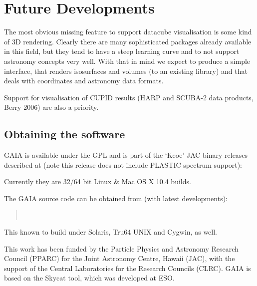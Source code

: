 \documentclass[11pt,twoside]{article}  %
\begin{document}
\section{Future Developments}

The most obvious missing feature to support datacube visualisation is some
kind of 3D rendering. Clearly there are many sophisticated packages already
available in this field, but they tend to have a steep learning curve and to
not support astronomy concepts very well. With that in mind we expect to
produce a simple interface, that renders isosurfaces and volumes (to an
existing library) and that deals with coordinates and astronomy data formats.

Support for visualisation of CUPID results (HARP and SCUBA-2 data products,
Berry 2006) are also a priority.

\subsection{Obtaining the software}

GAIA is available under the GPL and is part of the `Keoe' JAC binary releases
described at (note this release does not include PLASTIC spectrum support):
\begin{quote}
\end{quote}
Currently they are 32/64 bit Linux \& Mac OS X 10.4 builds.

The GAIA source code can be obtained from (with latest developments):
\begin{quote}
 \\
\end{quote}
This known to build under Solaris, Tru64 UNIX and Cygwin, as well.

\acknowledgments

This work has been funded by the Particle Physics and Astronomy Research
Council (PPARC) for the Joint Astronomy Centre, Hawaii (JAC), with the support
of the Central Laboratories for the Research Councils (CLRC). GAIA is based on
the Skycat tool, which was developed at ESO.
\end{document}

